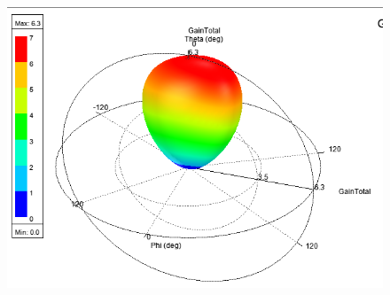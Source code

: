 \documentclass[10pt, a4paper]{article}%
\begin{document}
\begin{figure}[ht!]
\begin{minipage}{0.32\textwidth}
		\includegraphics[width= 1\textwidth]{RAD_lin_coax.png}
	\end{minipage}
	\end{figure}
\clearpage
\end{document}
